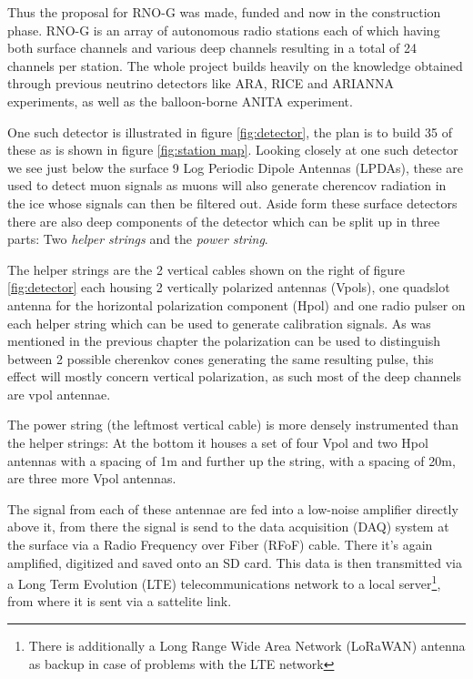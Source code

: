 \documentclass[11pt,a4paper,faculty=we,language=en,doctype=report]{cls/ugent-doc}
\begin{document}
Thus the proposal for RNO-G was made, funded and now in the construction phase.
RNO-G is an array of autonomous radio stations each of which
having both surface channels and various deep channels resulting in a total of
24 channels per station. The whole project builds heavily on the knowledge
obtained through previous neutrino detectors like ARA, RICE and ARIANNA
experiments, as well as the balloon-borne ANITA experiment.

One such detector is illustrated in figure \ref{fig:detector}, the plan is to
build 35 of these as is shown in figure \ref{fig:station map}.  Looking closely
at one such detector we see just below the surface 9 Log Periodic Dipole
Antennas (LPDAs), these are used to detect muon signals as muons will also
generate cherencov radiation in the ice whose signals can then be filtered out.
Aside form these surface detectors there are also deep components of the
detector which can be split up in three parts: Two \textit{helper strings} and
the \textit{power string}.

The helper strings are the 2 vertical cables shown on the right of figure
\ref{fig:detector} each housing 2 vertically polarized antennas (Vpols), one
quadslot antenna for the horizontal polarization component (Hpol) and one radio
pulser on each helper string which can be used to generate calibration signals.
As was mentioned in the previous chapter the polarization can be used to
distinguish between 2 possible cherenkov cones generating the same resulting
pulse, this effect will mostly concern vertical polarization, as such most
of the deep channels are vpol antennae.

The power string (the leftmost vertical cable) is more densely instrumented
than the helper strings: At the bottom it houses a set of four Vpol and two
Hpol antennas with a spacing of 1m and further up the string, with a spacing of
20m, are three more Vpol antennas.

The signal from each of these antennae are fed into a low-noise amplifier
directly above it, from there the signal is send to the data acquisition (DAQ)
system at the surface via a Radio Frequency over Fiber (RFoF) cable. There it's
again amplified, digitized and saved onto an SD card. This data is then
transmitted via a Long Term Evolution (LTE) telecommunications network to a
local server\footnote{There is additionally a Long Range Wide Area Network
(LoRaWAN) antenna as backup in case of problems with the LTE network}, from
where it is sent via a sattelite link.
\end{document}
